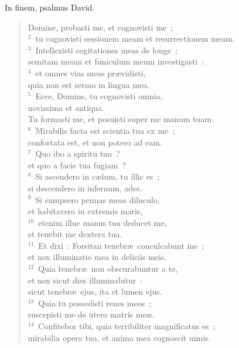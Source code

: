 \bchapter
\lettrine[lines=3,image=true,loversize=0.05,lraise=-0.03]{I}{}n finem, psalmus David. \begin{flushleft}\begin{verse}\vspace{6pt}Domine, probasti me, et cognovisti me~;\\
${}^{2}$~tu cognovisti sessionem meam et resurrectionem meam.\\
${}^{3}$~Intellexisti cogitationes meas de longe~;\\ semitam meam et funiculum meum investigasti~:\\
${}^{4}$~et omnes vias meas pr\ae vidisti,\\ quia non est sermo in lingua mea.\\
${}^{5}$~Ecce, Domine, tu cognovisti omnia,\\ novissima et antiqua.\\ Tu formasti me, et posuisti super me manum tuam.\\
${}^{6}$~Mirabilis facta est scientia tua ex me~;\\ confortata est, et non potero ad eam.\\
${}^{7}$~Quo ibo a spiritu tuo~?\\ et quo a facie tua fugiam~?\\
${}^{8}$~Si ascendero in c\ae lum, tu illic es~;\\ si descendero in infernum, ades.\\
${}^{9}$~Si sumpsero pennas meas diluculo,\\ et habitavero in extremis maris,\\
${}^{10}$~etenim illuc manus tua deducet me,\\ et tenebit me dextera tua.\\
${}^{11}$~Et dixi~: Forsitan tenebr\ae\ conculcabunt me~;\\ et nox illuminatio mea in deliciis meis.\\
${}^{12}$~Quia tenebr\ae\ non obscurabuntur a te,\\ et nox sicut dies illuminabitur~:\\ sicut tenebr\ae\ ejus, ita et lumen ejus.\\
${}^{13}$~Quia tu possedisti renes meos~;\\ suscepisti me de utero matris me\ae .\\
${}^{14}$~Confitebor tibi, quia terribiliter magnificatus es~;\\ mirabilia opera tua, et anima mea cognoscit nimis.\\

\end{verse}
\end{flushleft}
